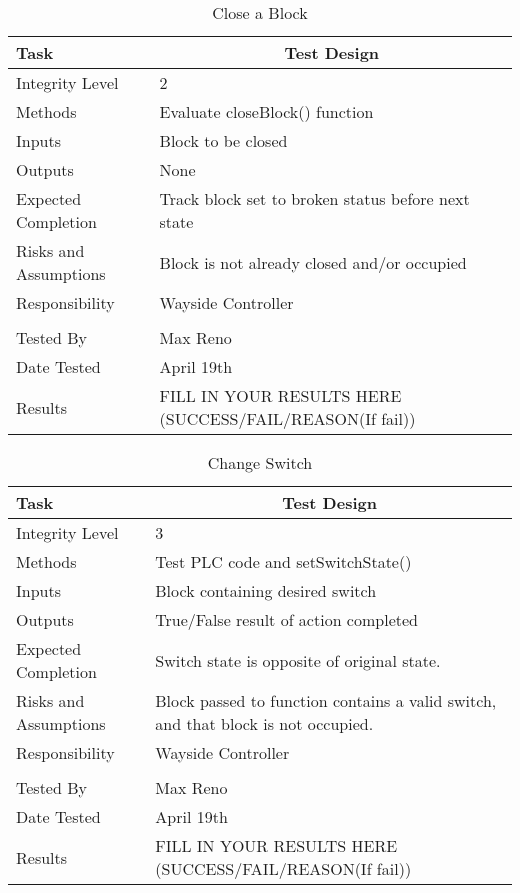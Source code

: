 \documentclass[]{article}
\begin{document}
	\begin{table}[H]
		\centering
		\caption{Close a Block}
		\begin{tabular}{|l|l|}
			\hline
			Task & \multicolumn{1}{c|}{Test Design} \\ \hline
			Integrity Level & 2 \\ \hline
			Methods & Evaluate closeBlock() function\\ \hline
			Inputs &  Block to be closed\\ \hline
			Outputs & None\\ \hline
			Expected Completion & Track block set to broken status before next state \\ \hline
			Risks and Assumptions & \parbox[t]{10cm}{Block is not already closed and/or occupied} \\ \hline
			Responsibility & Wayside Controller\\ \hline
			\\ \hline
			Tested By   &  Max Reno\\	\hline
			Date Tested & \parbox[t]{10cm}{April 19th}\\ \hline
			Results & FILL IN YOUR RESULTS HERE (SUCCESS/FAIL/REASON(If fail))\\ \hline
		\end{tabular}
	\end{table}
	
	
	\begin{table}[H]
		\centering
		\caption{Change Switch}
		\begin{tabular}{|l|l|}
			\hline
			Task & \multicolumn{1}{c|}{Test Design} \\ \hline
			Integrity Level & 3 \\ \hline
			Methods & Test PLC code and setSwitchState()\\ \hline
			Inputs &  Block containing desired switch\\ \hline
			Outputs &  True/False result of action completed\\ \hline
			Expected Completion & Switch state is opposite of original state. \\ \hline
			Risks and Assumptions & \parbox[t]{10cm}{Block passed to function contains a valid switch, and that block is not occupied.} \\ \hline
			Responsibility & Wayside Controller\\ \hline
			\\ \hline
			Tested By   &  Max Reno\\	\hline
			Date Tested & \parbox[t]{10cm}{April 19th}\\ \hline
			Results & FILL IN YOUR RESULTS HERE (SUCCESS/FAIL/REASON(If fail))\\ \hline
		\end{tabular}
	\end{table}
	
\end{document}
